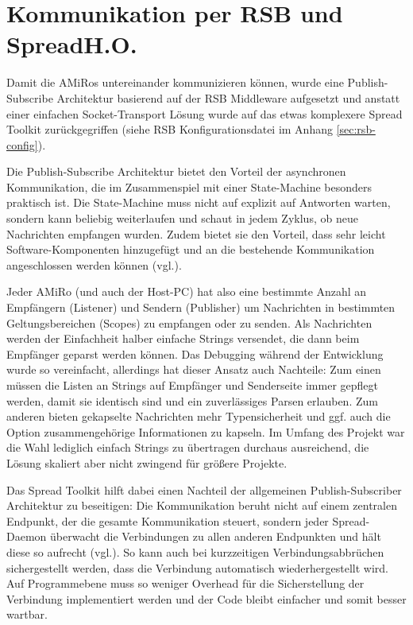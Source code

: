 \section[Kommunikation per RSB und Spread]{Kommunikation per RSB und Spread\hfill {\normalsize H.O.}}
Damit die AMiRos untereinander kommunizieren können, wurde eine Publish-Subscribe Architektur basierend auf der RSB Middleware aufgesetzt und anstatt einer einfachen Socket-Transport Lösung wurde auf das etwas komplexere Spread Toolkit zurückgegriffen (siehe RSB Konfigurationsdatei im Anhang \ref{sec:rsb-config}).

Die Publish-Subscribe Architektur bietet den Vorteil der asynchronen Kommunikation, die im Zusammenspiel mit einer State-Machine besonders praktisch ist. Die State-Machine muss nicht auf explizit auf Antworten warten, sondern kann beliebig weiterlaufen und schaut in jedem Zyklus, ob neue Nachrichten empfangen wurden. Zudem bietet sie den Vorteil, dass sehr leicht Software-Komponenten hinzugefügt und an die bestehende Kommunikation angeschlossen werden können (vgl.\cite{Siciliano:2007}).

Jeder AMiRo (und auch der Host-PC) hat also eine bestimmte Anzahl an Empfängern (Listener) und Sendern (Publisher) um Nachrichten in bestimmten Geltungsbereichen (Scopes) zu empfangen oder zu senden. Als Nachrichten werden der Einfachheit halber einfache Strings versendet, die dann beim Empfänger geparst werden können. Das Debugging während der Entwicklung wurde so vereinfacht, allerdings hat dieser Ansatz auch Nachteile: Zum einen müssen die Listen an Strings auf Empfänger und Senderseite immer gepflegt werden, damit sie identisch sind und ein zuverlässiges Parsen erlauben. Zum anderen bieten gekapselte Nachrichten mehr Typensicherheit und ggf. auch die Option zusammengehörige Informationen zu kapseln. Im Umfang des Projekt war die Wahl lediglich einfach Strings zu übertragen durchaus ausreichend, die Lösung skaliert aber nicht zwingend für größere Projekte.

Das Spread Toolkit hilft dabei einen Nachteil der allgemeinen Publish-Subscriber Architektur zu beseitigen: Die Kommunikation beruht nicht auf einem zentralen Endpunkt, der die gesamte Kommunikation steuert, sondern jeder Spread-Daemon überwacht die Verbindungen zu allen anderen Endpunkten und hält diese so aufrecht (vgl.\cite{Siciliano:2007}). So kann auch bei kurzzeitigen Verbindungsabbrüchen sichergestellt werden, dass die Verbindung automatisch wiederhergestellt wird. Auf Programmebene  muss so weniger Overhead für die Sicherstellung der Verbindung implementiert werden und der Code bleibt einfacher und somit besser wartbar.

